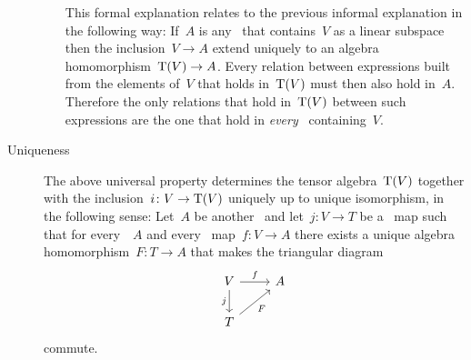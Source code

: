 \begin{recall}
\begin{description}
\begin{itemize}
          This formal explanation relates to the previous informal explanation in the following way:
          If~$A$ is any~{\algebra{$\kf$}} that contains~$V$ as a linear subspace then the inclusion~$V \to A$ extend uniquely to an algebra homomorphism~$\operatorname{T}(V) \to A$.
          Every relation between expressions built from the elements of~$V$ that holds in~$\operatorname{T}(V)$ must then also hold in~$A$.
          Therefore the only relations that hold in~$\operatorname{T}(V)$ between such expressions are the one that hold in \emph{every}~{\algebra{$\kf$}} containing~$V$.
      \end{itemize}
      
    \item[Uniqueness]
      The above universal property determines the tensor algebra~$\operatorname{T}(V)$ together with the inclusion~$i \colon V \to \operatorname{T}(V)$ uniquely up to unique isomorphism, in the following sense:
      Let~$A$ be another~{\algebra{$\kf$}} and let~$j \colon V \to T$ be a~{\linear{$\kf$}} map such that for every~{\algebra{$\kf$}}~$A$ and every~{\linear{$\kf$}} map~$f \colon V \to A$ there exists a unique algebra homomorphism~$F \colon T \to A$ that makes the triangular diagram
      \[
        \begin{tikzcd}
          V
          \arrow{r}[above]{f}
          \arrow{d}[left]{j}
          &
          A
          \\
          T
          \arrow{ur}[below right]{F}
          &
          {}
        \end{tikzcd}
      \]
      commute.
      

\end{description}
\end{recall}
